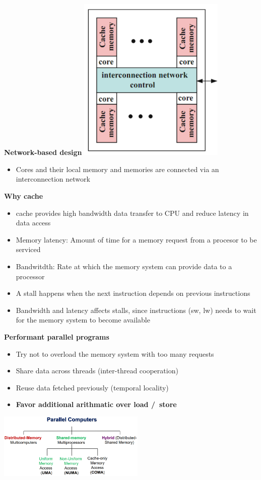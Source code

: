 \documentclass[10pt, landscape]{article}
\begin{document}
\begin{multicols}{4}
\textbf{Network-based design}
\includegraphics*[width=7cm]{network_design}
\begin{itemize}
    \item Cores and their local memory and memories are connected via an interconnection network
\end{itemize}

\textbf{Why cache}
\begin{itemize}
    \item cache provides high bandwidth data transfer to CPU and reduce latency in data access 
    \item Memory latency: Amount of time for a memory request from a procesor to be serviced 
    \item Bandwitdth: Rate at which the memory system can provide data to a processor 
    \item A stall happens when the next instruction depends on previous instructions
    \item Bandwidth and latency affects stalls, since instructions (sw, lw) needs to wait for the memory system to become available
\end{itemize}

\textbf{Performant parallel programs}
\begin{itemize}
    \item Try not to overload the memory system with too many requests
    \item Share data across threads (inter-thread cooperation)
    \item Reuse data fetched previously (temporal locality)
    \item \textbf{Favor additional arithmatic over load /\ store}
\end{itemize}

\includegraphics*[width=7cm]{parallel_memory}



\end{multicols}
\end{document}
